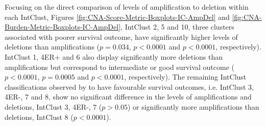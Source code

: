 Focusing on the direct comparison of levels of amplification to deletion within each IntClust, Figures \ref{fig:CNA-Score-Metric-Boxplots-IC-AmpDel} and \ref{fig:CNA-Burden-Metric-Boxplots-IC-AmpDel}, IntClust 2, 5 and 10, three clusters associated with poorer survival outcome, have significantly higher levels of deletions than amplifications ($p = 0.034$, $p < 0.0001$ and $p < 0.0001$, respectively). IntClust 1, 4ER+ and 6 also display significantly more deletions than amplifications but correspond to intermediate or good survival outcome ($p < 0.0001$, $p = 0.0005$ and $p < 0.0001$, respectively). The remaining IntClust classifications observed by \cite{pmid22522925} to have favourable survival outcomes, i.e. IntClust 3, 4ER-, 7 and 8, show no significant difference in the levels of amplifications and deletions, IntClust 3, 4ER-, 7 ($p > 0.05$) or significantly more amplifications than deletions, IntClust 8 ($p < 0.0001$).

